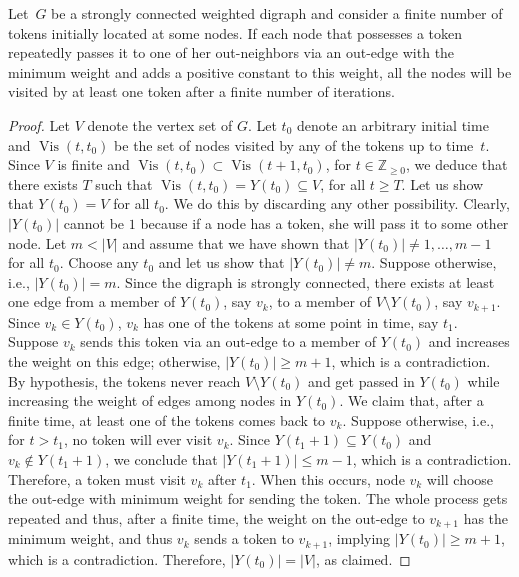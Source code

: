 \documentclass[final]{siamltex}
\begin{document}
\begin{lemma}\label{lemma:min_weight}
  Let~$G$ be a strongly connected weighted digraph and consider a
  finite number of tokens initially located at some nodes. If each
  node that possesses a token repeatedly passes it to one of her
  out-neighbors via an out-edge with the minimum weight and adds a
  positive constant to this weight, all the nodes will be visited by
  at least one token after a finite number of iterations.
\end{lemma}
\begin{proof}
  Let $V$ denote the vertex set of $G $.  Let $t_0$ denote an
  arbitrary initial time and ${\operatorname{Vis}}(t,t_0)$ be the set of nodes
  visited by any of the tokens up to time~$t$. Since $V$ is finite and
  ${\operatorname{Vis}}(t,t_0) \subset {\operatorname{Vis}} (t+1,t_0)$, for $t \in
  {\mathbb{Z}_{\ge 0}}$, we deduce that there exists $T$ such that
  ${\operatorname{Vis}}(t,t_0) = Y(t_0) \subseteq V$, for all $t \ge T$. Let us
  show that $ Y(t_0) = V $ for all $t_0$.  We do this by discarding
  any other possibility. Clearly, $|Y(t_0)|$ cannot be $1$ because if
  a node has a token, she will pass it to some other node.  Let $m <
  |V|$ and assume that we have shown that $ |Y(t_0)| \neq 1,\ldots,
  m-1 $ for all $t_0$. Choose any $t_0$ and let us show that $
  |Y(t_0)|\neq m$. Suppose otherwise, i.e., $|Y(t_0)|=m$.  Since the
  digraph is strongly connected, there exists at least one edge from a
  member of $Y(t_0)$, say $ v_k $, to a member of $ V \setminus
  Y(t_0)$, say $ v_{k+1} $.  Since $v_k \in Y(t_0)$, $v_k$ has one of
  the tokens at some point in time, say $t_1$.  Suppose $ v_k $ sends
  this token via an out-edge to a member of $ Y(t_0) $ and increases
  the weight on this edge; otherwise, $|Y(t_0)|\ge m+1$, which is a
  contradiction. By hypothesis, the tokens never reach $ V\setminus
  Y(t_0) $ and get passed in $Y(t_0)$ while increasing the weight of
  edges among nodes in $Y(t_0)$.  We claim that, after a finite time,
  at least one of the tokens comes back to $ v_k $.  Suppose
  otherwise, i.e., for $t>t_1$, no token will ever visit $v_k$. Since
  $Y(t_1+1) \subseteq Y(t_0)$ and $v_k \not \in Y(t_1+1) $, we
  conclude that $|Y(t_1+1)|\le m-1$, which is a
  contradiction. Therefore, a token must visit $v_k$ after $t_1$. When
  this occurs, node $ v_k $ will choose the out-edge with minimum
  weight for sending the token. The whole process gets repeated and
  thus, after a finite time, the weight on the out-edge to $ v_{k+1} $
  has the minimum weight, and thus $v_k$ sends a token to $v_{k+1}$,
  implying $|Y(t_0)| \ge m+1$, which is a contradiction. Therefore,
  $|Y(t_0)|=|V|$, as claimed.
  

\end{proof}
\end{document}
